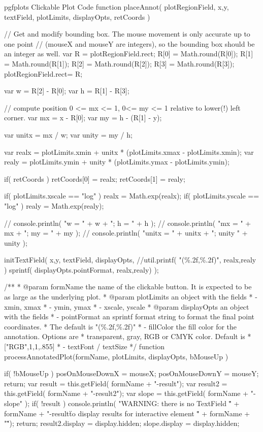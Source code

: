 \begin{insDLJS}[processAnnotatedPlot]{\jobname}{pgfplots Clickable Plot Code}
function placeAnnot( plotRegionField, x,y, textField, plotLimits, displayOpts, retCoords )
{
	// Get and modify bounding box. The mouse movement is only accurate up to one point 
	// (mouseX and mouseY are integers), so the bounding box should be an integer as well.
	var R = plotRegionField.rect;
	R[0] = Math.round(R[0]);
	R[1] = Math.round(R[1]);
	R[2] = Math.round(R[2]);
	R[3] = Math.round(R[3]);
	plotRegionField.rect= R;

	var w = R[2] - R[0];
	var h = R[1] - R[3];

	// compute position 0 <= mx <= 1, 0<= my <= 1 relative to lower(!) left corner.
	var mx = x - R[0];
	var my = h - (R[1] - y);

	var unitx = mx / w;
	var unity = my / h;

	var realx = plotLimits.xmin + unitx * (plotLimits.xmax - plotLimits.xmin);
	var realy = plotLimits.ymin + unity * (plotLimits.ymax - plotLimits.ymin);

	if( retCoords ) {
		retCoords[0] = realx;
		retCoords[1] = realy;
	}

	if( plotLimits.xscale == "log" )
		realx = Math.exp(realx);
	if( plotLimits.yscale == "log" )
		realy = Math.exp(realy);

//	console.println( "w = " + w + "; h = " + h );
//	console.println( "mx = " + mx + "; my = " + my );
//	console.println( "unitx = " + unitx + "; unity " + unity );

	initTextField( x,y, textField, displayOpts,
		//util.printf( "(\%.2f,\%.2f)", realx,realy )
		sprintf( displayOpts.pointFormat, realx,realy) );

}

/**
 * @param formName the name of the clickable button. It is expected to be as large as the underlying plot.
 * @param plotLimits an object with the fields
 *   - xmin, xmax
 *   - ymin, ymax
 *   - xscale, yscale
 * @param displayOpts an object with the fields
 *   - pointFormat an sprintf format string to format the final point coordinates.
 *   The default is  "(\%.2f,\%.2f)"
 *   - fillColor the fill color for the annotation. Options are
 *    transparent, gray, RGB or CMYK color. Default is
 *       ["RGB",1,1,.855]
 *	 - textFont / textSize
 */
function processAnnotatedPlot(formName, plotLimits, displayOpts, bMouseUp ) 
{
	if( !bMouseUp ) {
		posOnMouseDownX = mouseX;
		posOnMouseDownY = mouseY;
		return;
	}
	var result = this.getField( formName + "-result");
	var result2 = this.getField( formName + "-result2");
	var slope 	= this.getField( formName + "-slope" );
	if( !result ) {
		console.println( "WARNING: there is no TextField \"" + formName + "-result\" to display results for interactive element \"" + formName + "\"");
		return;
	}
	result2.display = display.hidden;
	slope.display = display.hidden;

}
\end{insDLJS}
